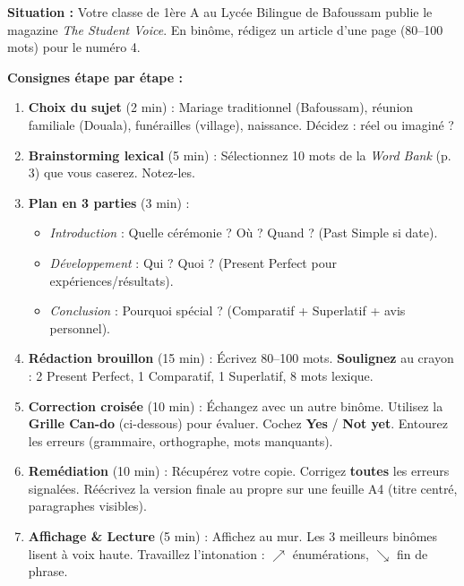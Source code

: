 \documentclass[11pt]{article}
\begin{document}
\begin{experience}
\textbf{Situation :} Votre classe de 1ère A au Lycée Bilingue de Bafoussam publie le magazine \emph{The Student Voice}. En binôme, rédigez un article d'une page (80--100 mots) pour le numéro 4.

\textbf{Consignes étape par étape :}
\begin{enumerate}
\item \textbf{Choix du sujet} (2 min) : Mariage traditionnel (Bafoussam), réunion familiale (Douala), funérailles (village), naissance. Décidez : réel ou imaginé ?
\item \textbf{Brainstorming lexical} (5 min) : Sélectionnez 10 mots de la \emph{Word Bank} (p. 3) que vous caserez. Notez-les.
\item \textbf{Plan en 3 parties} (3 min) :
      \begin{itemize}
      \item \emph{Introduction} : Quelle cérémonie ? Où ? Quand ? (Past Simple si date).
      \item \emph{Développement} : Qui ? Quoi ? (Present Perfect pour expériences/résultats).
      \item \emph{Conclusion} : Pourquoi spécial ? (Comparatif + Superlatif + avis personnel).
      \end{itemize}
\item \textbf{Rédaction brouillon} (15 min) : Écrivez 80--100 mots. \textbf{Soulignez} au crayon : 2 Present Perfect, 1 Comparatif, 1 Superlatif, 8 mots lexique.
\item \textbf{Correction croisée} (10 min) : Échangez avec un autre binôme. Utilisez la \textbf{Grille Can-do} (ci-dessous) pour évaluer. Cochez \textbf{Yes} / \textbf{Not yet}. Entourez les erreurs (grammaire, orthographe, mots manquants).
\item \textbf{Remédiation} (10 min) : Récupérez votre copie. Corrigez \textbf{toutes} les erreurs signalées. Réécrivez la version finale au propre sur une feuille A4 (titre centré, paragraphes visibles).
\item \textbf{Affichage \& Lecture} (5 min) : Affichez au mur. Les 3 meilleurs binômes lisent à voix haute. Travaillez l'intonation : $\nearrow$ énumérations, $\searrow$ fin de phrase.
\end{enumerate}
\end{experience}
\end{document}
